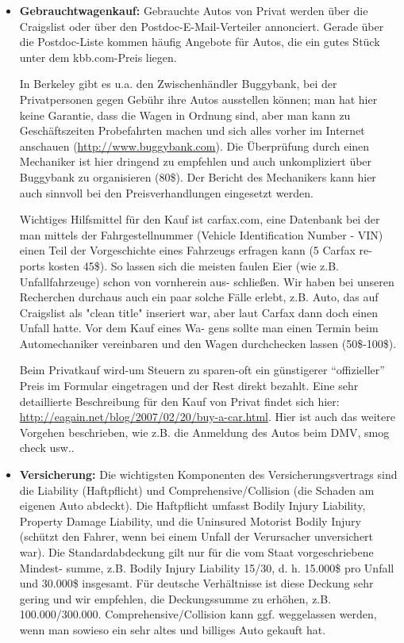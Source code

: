 \documentclass[a4paper]{scrreprt}
\begin{document}
\begin{itemize}
	\item \textbf{Gebrauchtwagenkauf:} Gebrauchte Autos von Privat werden über die Craigslist oder über den Postdoc-E-Mail-Verteiler annonciert. Gerade über die Postdoc-Liste kommen häufig Angebote für Autos, die ein gutes Stück unter dem kbb.com-Preis liegen.

	In Berkeley gibt es u.a. den Zwischenhändler Buggybank, bei der Privatpersonen gegen Gebühr ihre Autos ausstellen können; man hat hier keine Garantie, dass die Wagen in Ordnung sind, aber man kann zu Geschäftszeiten Probefahrten machen und sich alles vorher im Internet anschauen (\url{http://www.buggybank.com}). Die Überprüfung durch einen Mechaniker ist hier dringend zu empfehlen und auch unkompliziert über Buggybank zu organisieren (80\$). Der Bericht des Mechanikers kann hier auch sinnvoll bei den Preisverhandlungen eingesetzt werden.
	
	Wichtiges Hilfsmittel für den Kauf ist carfax.com, eine Datenbank bei der man mittels der Fahrgestellnummer (Vehicle Identification Number - VIN) einen Teil der Vorgeschichte eines Fahrzeugs erfragen kann (5 Carfax re- ports kosten 45\$). So lassen sich die meisten faulen Eier (wie z.B. Unfallfahrzeuge) schon von vornherein aus- schließen. Wir haben bei unseren Recherchen durchaus auch ein paar solche Fälle erlebt, z.B. Auto, das auf Craigslist als "clean title" inseriert war, aber laut Carfax dann doch einen Unfall hatte. Vor dem Kauf eines Wa- gens sollte man einen Termin beim Automechaniker vereinbaren und den Wagen durchchecken lassen (50\$-100\$).

	Beim Privatkauf wird-um Steuern zu sparen-oft ein günstigerer "`offizieller"' Preis im Formular eingetragen und der Rest direkt bezahlt. Eine sehr detaillierte Beschreibung für den Kauf von Privat findet sich hier: \url{http://eagain.net/blog/2007/02/20/buy-a-car.html}. Hier ist auch das weitere Vorgehen beschrieben, wie z.B. die Anmeldung des Autos beim DMV, smog check usw..
	
	\item \textbf{Versicherung:} Die wichtigsten Komponenten des Versicherungsvertrags sind die Liability (Haftpflicht) und Comprehensive/Collision (die Schaden am eigenen Auto abdeckt). Die Haftpflicht umfasst Bodily Injury Liability, Property Damage Liability, und die Uninsured Motorist Bodily Injury (schützt den Fahrer, wenn bei einem Unfall der Verursacher unversichert war). Die Standardabdeckung gilt nur für die vom Staat vorgeschriebene Mindest- summe, z.B. Bodily Injury Liability 15/30, d. h. 15.000\$ pro Unfall und 30.000\$ insgesamt. Für deutsche Verhältnisse ist diese Deckung sehr gering und wir empfehlen, die Deckungssumme zu erhöhen, z.B. 100.000/300.000. Comprehensive/Collision kann ggf. weggelassen werden, wenn man sowieso ein sehr altes und billiges Auto gekauft hat.


\end{itemize}
\end{document}
